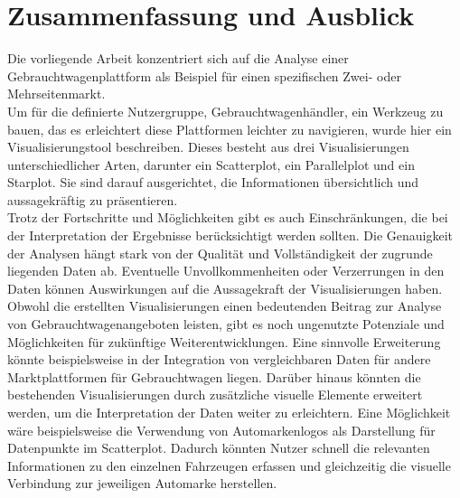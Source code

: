 \section{Zusammenfassung und Ausblick}

Die vorliegende Arbeit konzentriert sich auf die Analyse einer Gebrauchtwagenplattform als Beispiel für einen spezifischen Zwei- oder Mehrseitenmarkt. \\
Um für die definierte Nutzergruppe, Gebrauchtwagenhändler, ein Werkzeug zu bauen, das es erleichtert diese Plattformen leichter zu navigieren, wurde hier ein Visualisierungstool beschreiben. 
Dieses besteht aus drei Visualisierungen unterschiedlicher Arten, darunter ein Scatterplot, ein Parallelplot und ein Starplot. Sie sind darauf ausgerichtet, die Informationen übersichtlich und aussagekräftig zu präsentieren. \\
Trotz der Fortschritte und Möglichkeiten gibt es auch Einschränkungen, die bei der Interpretation der Ergebnisse berücksichtigt werden sollten. Die Genauigkeit der Analysen hängt stark von der Qualität und Vollständigkeit der zugrunde liegenden Daten ab. Eventuelle Unvollkommenheiten oder Verzerrungen in den Daten können Auswirkungen auf die Aussagekraft der Visualisierungen haben. \\
Obwohl die erstellten Visualisierungen einen bedeutenden Beitrag zur Analyse von Gebrauchtwagenangeboten leisten, gibt es noch ungenutzte Potenziale und Möglichkeiten für zukünftige Weiterentwicklungen. Eine sinnvolle Erweiterung könnte beispielsweise in der Integration von vergleichbaren Daten für andere Marktplattformen für Gebrauchtwagen liegen. 
Darüber hinaus könnten die bestehenden Visualisierungen durch zusätzliche visuelle Elemente erweitert werden, um die Interpretation der Daten weiter zu erleichtern. Eine Möglichkeit wäre beispielsweise die Verwendung von Automarkenlogos als Darstellung für Datenpunkte im Scatterplot. Dadurch könnten Nutzer schnell die relevanten Informationen zu den einzelnen Fahrzeugen erfassen und gleichzeitig die visuelle Verbindung zur jeweiligen Automarke herstellen.\\